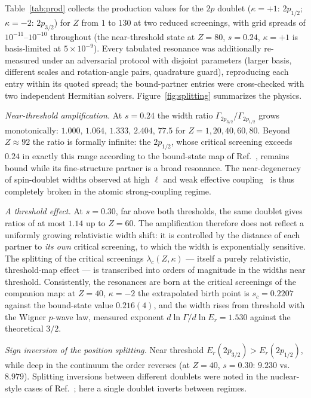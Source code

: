 \documentclass[aps,pra,twocolumn,superscriptaddress,floatfix,longbibliography]{revtex4-2}
\begin{document}
Table~\ref{tab:prod} collects the production values for the $2p$
doublet ($\kappa=+1$: $2p_{1/2}$; $\kappa=-2$: $2p_{3/2}$) for $Z$ from
$1$ to $130$ at two reduced screenings, with grid spreads of
$10^{-11}$--$10^{-10}$ throughout (the near-threshold state at $Z=80$,
$s=0.24$, $\kappa=+1$ is basis-limited at $5\times10^{-9}$). Every
tabulated resonance was additionally re-measured under an adversarial
protocol with disjoint parameters (larger basis, different scales and
rotation-angle pairs, quadrature guard), reproducing each entry within
its quoted spread; the bound-partner entries were cross-checked with
two independent Hermitian solvers. Figure~\ref{fig:splitting}
summarizes the physics.

\emph{Near-threshold amplification.} At $s=0.24$ the width ratio
$\Gamma_{2p_{3/2}}/\Gamma_{2p_{1/2}}$ grows monotonically:
$1.000$, $1.064$, $1.333$, $2.404$, $77.5$ for
$Z=1,20,40,60,80$. Beyond $Z\approx92$ the ratio is formally infinite:
the $2p_{1/2}$, whose critical screening exceeds $0.24$ in exactly this
range according to the bound-state map of Ref.~\cite{companionA},
remains bound while its fine-structure partner is a broad resonance.
The near-degeneracy of spin-doublet widths observed at high $\ell$ and
weak effective coupling~\cite{Shi2014} is thus completely broken in
the atomic strong-coupling regime.

\emph{A threshold effect.} At $s=0.30$, far above both thresholds, the
same doublet gives ratios of at most $1.14$ up to $Z=60$. The
amplification therefore does not reflect a uniformly growing
relativistic width shift: it is controlled by the distance of each
partner to \emph{its own} critical screening, to which the width is
exponentially sensitive. The splitting of the critical screenings
$\lambda_{c}(Z,\kappa)$ --- itself a purely relativistic, threshold-map
effect --- is transcribed into orders of magnitude in the widths near
threshold. Consistently, the resonances are born at the critical
screenings of the companion map: at $Z=40$, $\kappa=-2$ the
extrapolated birth point is $s_{c}=0.2207$ against the bound-state
value $0.216(4)$, and the width rises from threshold with the Wigner
$p$-wave law, measured exponent
$d\ln\Gamma/d\ln E_{r}=1.530$ against the theoretical $3/2$.

\emph{Sign inversion of the position splitting.} Near threshold
$E_{r}(2p_{3/2})>E_{r}(2p_{1/2})$, while deep in the continuum the
order reverses (at $Z=40$, $s=0.30$: $9.230$ vs.\ $8.979$). Splitting
inversions between different doublets were noted in the nuclear-style
cases of Ref.~\cite{Shi2014}; here a single doublet inverts between
regimes.
\end{document}
